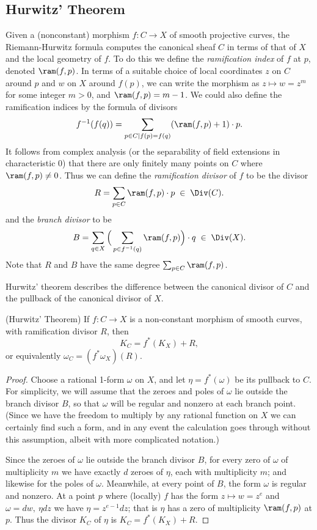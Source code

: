 \subsection{Hurwitz' Theorem}
 Given a (nonconstant) morphism $f : C \to X$ of smooth projective curves, the Riemann-Hurwitz formula computes the canonical sheaf  $C$ in terms of that of  $X$ and the local geometry of $f$. To do this we define the
\emph{ramification index} of $f$ at $p$,  denoted $\ram(f,p)$. In terms of a suitable choice of local coordinates $z$ on $C$ around $p$ and $w$ on $X$ around $f(p)$, we can write the morphism as $z \mapsto w = z^m$ for some integer $m > 0$, and $\ram(f,p) = m-1$. We could also define the ramification indices
by the formula of divisors
$$
 f^{-1}(f(q)) = \sum_{p\in C \mid f(p)=f(q)} (\ram(f,p)+1)\cdot p.
 $$
It follows from complex analysis (or the separability of field extensions in characteristic 0) that there are only finitely many
points on $C$ where $\ram(f,p) \neq 0$. Thus we can define the \emph{ramification divisor} of $f$ to be the divisor
 $$
 R = \sum_{p \in C} \ram(f,p)\cdot p \; \in \;  \Div(C).
 $$
 and the \emph{branch divisor} to be
 $$
 B = \sum_{q \in X} \Big(\sum_{p \in f^{-1}(q)} \ram(f,p) \Big)\cdot q \; \in \; \Div(X).
 $$
 Note that $R$ and $B$ have the same degree $\sum_{p \in C} \ram(f,p)$. 

 Hurwitz' theorem describes the difference between the canonical divisor of $C$ and the pullback of the canonical divisor of $X$.
\begin{theorem}(Hurwitz' Theorem) \cite[****]{H} \label{Hurwitz}
If $f:C\to X$ is a non-constant morphism of smooth curves, with ramification divisor $R$, then 
$$
K_C = f^{*}(K_{X})+R,$$
or equivalently
$
\omega_{C} = (f^{*}\omega_{X})(R).
$
\end{theorem}
 
\begin{proof}
Choose a rational 1-form $\omega$ on $X$, and let $\eta = f^*(\omega)$ be its pullback to $C$. For simplicity, we will assume that the zeroes and poles of $\omega$ lie outside the branch divisor $B$, so that $\omega$ will be regular and nonzero at each branch point. (Since we have the freedom to multiply by any rational function on $X$ we can certainly find such a form, and in any event the calculation goes through without this assumption, albeit with more complicated notation.) 

Since the zeroes of $\omega$ lie outside the branch divisor $B$, for every zero of $\omega$ of multiplicity $m$ we have exactly $d$ zeroes of $\eta$, each with multiplicity $m$; and likewise for the poles of $\omega$. Meanwhile, at every point of $B$, the form $\omega$ is regular and nonzero. At a point $p$ where (locally) $f$ has the form $z \mapsto w = z^{e}$
and $\omega = dw,\ \eta dz$ we have $\eta = z^{e-1}dz$; that is $\eta$ has a zero of multiplicity $\ram(f,p)$ at  $p$.
Thus the divisor $K_{C}$ of $\eta$ is
$K_{C} = f^{*}(K_{X})+R$.
\end{proof}


